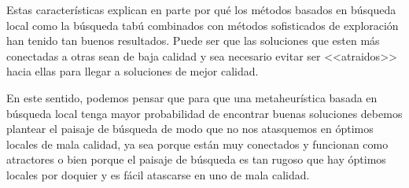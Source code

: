 Estas características explican en parte por qué los métodos basados en búsqueda local como la búsqueda tabú combinados con métodos sofisticados de exploración han tenido tan buenos resultados. Puede ser que las soluciones que esten más conectadas a otras sean de baja calidad y sea necesario evitar ser <<atraidos>> hacia ellas para llegar a soluciones de mejor calidad.

En este sentido, podemos pensar que para que una metaheurística basada en búsqueda local tenga mayor probabilidad de encontrar buenas soluciones debemos plantear el paisaje de búsqueda de modo que no nos atasquemos en óptimos locales de mala calidad, ya sea porque están muy conectados y funcionan como atractores o bien porque el paisaje de búsqueda es tan rugoso que hay óptimos locales por doquier y es fácil atascarse en uno de mala calidad.
